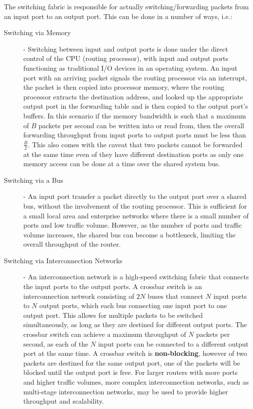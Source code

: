 \documentclass[12pt letter]{report}
\begin{document}
The switching fabric is responsible for actually switching/forwarding
packets from an input port to an output port. This can be done in a
number of ways, i.e.:
\begin{description}
  \item[Switching via Memory] - Switching between input and output
    ports is done under the direct control of the CPU (routing
    processor), with input and output ports functioning as
    traditional I/O devices in an operating system. An input port
    with an arriving packet signals the routing processor via an
    interrupt, the packet is then copied into processor memory, where
    the routing processor extracts the destination address, and
    looked up the appropriate output port in the forwarding table and
    is then copied to the output port's buffers.
    In this scenario if the memory  bandwidth is such that a maximum
    of $B$ packets per second can be written into or read from, then
    the overall forwarding throughput from input ports to output
    ports must be less than $\displaystyle{\frac{B}{2}}$. This also
    comes with the caveat that two packets cannot be forwarded at the
    same time even of they have different destination ports as only one memory
    access can be done at a time over the shared system bus.
  \item[Switching via a Bus] - An input port transfer a packet
    directly to the output port over a shared bus, without the
    involvement of the routing processor. This is sufficient for a
    small local area and enterprise networks where there is a small
    number of ports and low traffic volume. However, as the number of
    ports and traffic volume increases, the shared bus can become a
    bottleneck, limiting the overall throughput of the router.
  \item[Switching via Interconnection Networks] - An interconnection
    network is a high-speed switching fabric that connects the input
    ports to the output ports. A crossbar switch is an
    interconnection network consisting of $2N$ buses that connect $N$
    input ports to $N$ output ports, which each bus connecting one
    input port to one output port. This allows for multiple packets
    to be switched simultaneously, as long as they are destined for
    different output ports. The crossbar switch can achieve a maximum
    throughput of $N$ packets per second, as each of the $N$ input
    ports can be connected to a different output port at the same time.
    A crossbar switch is \textbf{non-blocking}, however of two
    packets are destined for the same output port, one of the packets
    will be blocked until the output port is free. For larger routers
    with more ports and higher traffic volumes, more complex
    interconnection networks, such as multi-stage interconnection
    networks, may be used to provide higher throughput and scalability.
\end{description}
\end{document}
